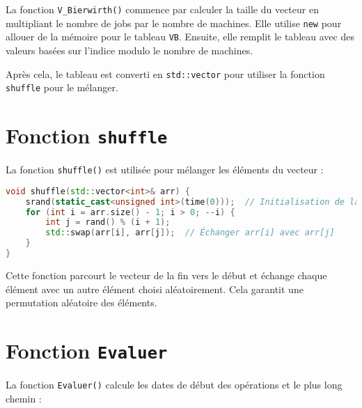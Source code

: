 \documentclass[a4paper,12pt]{article}
\begin{document}
La fonction \texttt{V\_Bierwirth()} commence par calculer la taille du vecteur en multipliant le nombre de jobs par le nombre de machines. Elle utilise \texttt{new} pour allouer de la mémoire pour le tableau \texttt{VB}. Ensuite, elle remplit le tableau avec des valeurs basées sur l'indice modulo le nombre de machines.

Après cela, le tableau est converti en \texttt{std::vector} pour utiliser la fonction \texttt{shuffle} pour le mélanger.

\section{Fonction \texttt{shuffle}}

La fonction \texttt{shuffle()} est utilisée pour mélanger les éléments du vecteur :

\begin{lstlisting}[language=C++]
void shuffle(std::vector<int>& arr) {
    srand(static_cast<unsigned int>(time(0)));  // Initialisation de la graine
    for (int i = arr.size() - 1; i > 0; --i) {
        int j = rand() % (i + 1);
        std::swap(arr[i], arr[j]);  // Échanger arr[i] avec arr[j]
    }
}
\end{lstlisting}

Cette fonction parcourt le vecteur de la fin vers le début et échange chaque élément avec un autre élément choisi aléatoirement. Cela garantit une permutation aléatoire des éléments.

\section{Fonction \texttt{Evaluer}}

La fonction \texttt{Evaluer()} calcule les dates de début des opérations et le plus long chemin :
\end{document}
